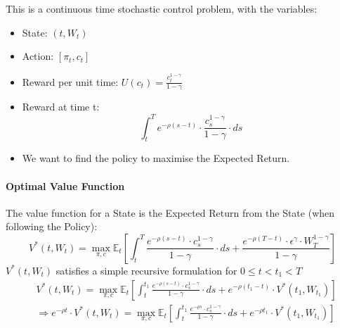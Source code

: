 \documentclass[11pt]{article}
\begin{document}
This is a continuous time stochastic control problem, with the variables:
\begin{itemize}
    \item State: $(t, W_t)$
    \item Action: $[\pi_t, c_t]$
    \item Reward per unit time: $U(c_t) = \frac{c^{1-\gamma}_t}{1-\gamma}$
    \item Reward at time t: 
        $$
        \int_t^T e^{-\rho(s-t)} \cdot \frac{c_s^{1-\gamma}}{1-\gamma} \cdot d s
        $$
    \item We want to find the policy to maximise the Expected Return. 
\end{itemize}

\paragraph*{Optimal Value Function}
The value function for a State is the Expected Return from the State (when following the Policy):
$$
V^*\left(t, W_t\right)=\max _{\pi, c} \mathbb{E}_t\left[\int_t^T \frac{e^{-\rho(s-t)} \cdot c_s^{1-\gamma}}{1-\gamma} \cdot d s+\frac{e^{-\rho(T-t)} \cdot \epsilon^\gamma \cdot W_T^{1-\gamma}}{1-\gamma}\right]
$$
$V^*\left(t, W_t\right)$ satisfies a simple recursive formulation for $0 \leq t<t_1<T$
$$
\begin{aligned}
& V^*\left(t, W_t\right)=\max _{\pi, c} \mathbb{E}_t\left[\int_t^{t_1} \frac{e^{-\rho(s-t)} \cdot c_s^{1-\gamma}}{1-\gamma} \cdot d s+e^{-\rho\left(t_1-t\right)} \cdot V^*\left(t_1, W_{t_1}\right)\right] \\
& \Rightarrow e^{-\rho t} \cdot V^*\left(t, W_t\right)=\max _{\pi, c} \mathbb{E}_t\left[\int_t^{t_1} \frac{e^{-\rho s} \cdot c_s^{1-\gamma}}{1-\gamma} \cdot d s+e^{-\rho t_1} \cdot V^*\left(t_1, W_{t_1}\right)\right]
\end{aligned}
$$
\end{document}
